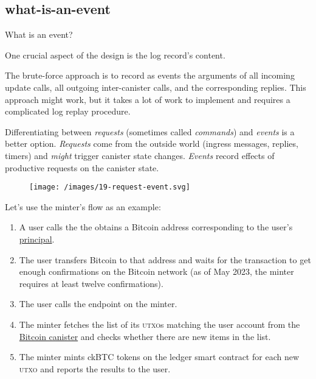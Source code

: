 \documentclass{article}
\begin{document}
\subsection{what-is-an-event}{What is an event?}

One crucial aspect of the design is the log record's content.

The brute-force approach is to record as events the arguments of all incoming update calls, all outgoing inter-canister calls, and the corresponding replies.
This approach might work, but it takes a lot of work to implement and requires a complicated log replay procedure.

Differentiating between \emph{requests} (sometimes called \emph{commands}) and \emph{events} is a better option.
\emph{Requests} come from the outside world (ingress messages, replies, timers) and \emph{might} trigger canister state changes.
\emph{Events} record effects of productive requests on the canister state.

\begin{figure}[grayscale-diagram]
  \texttt{[image: /images/19-request-event.svg]}
\end{figure}

Let's use the minter's \href{https://sourcegraph.com/github.com/dfinity/ic@1cbf1f39d31bc426c1e15b073c4ac86d75056bb2/-/blob/rs/bitcoin/ckbtc/minter/ckbtc_minter.did?L253}{} flow as an example:

\begin{enumerate}
  \item
    A user calls the \href{https://sourcegraph.com/github.com/dfinity/ic@1cbf1f39d31bc426c1e15b073c4ac86d75056bb2/-/blob/rs/bitcoin/ckbtc/minter/ckbtc_minter.did?L246}{} the obtains a Bitcoin address corresponding to the user's \href{https://internetcomputer.org/docs/current/references/ic-interface-spec#principal}{principal}.
  \item
    The user transfers Bitcoin to that address and waits for the transaction to get enough confirmations on the Bitcoin network (as of May 2023, the minter requires at least twelve confirmations).
  \item
    The user calls the  endpoint on the minter.
  \item
    The minter fetches the list of its \textsc{utxo}s matching the user account from the \href{https://github.com/dfinity/bitcoin-canister}{Bitcoin canister} and checks whether there are new items in the list.
  \item
    The minter mints ckBTC tokens on the ledger smart contract for each new \textsc{utxo} and reports the results to the user.
\end{enumerate}
\end{document}
